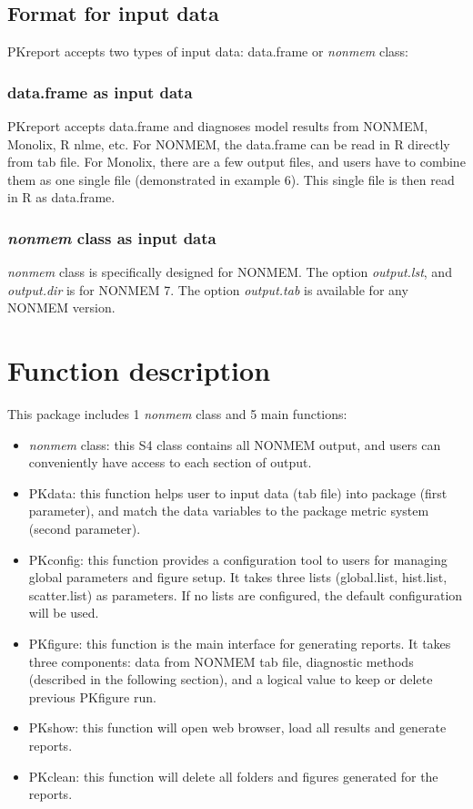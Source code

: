 \documentclass[a4paper]{article}
\begin{document}
\subsection{Format for input data}

PKreport accepts two types of input data: data.frame or \textit{nonmem} class:

\subsubsection{data.frame as input data}

PKreport accepts data.frame and diagnoses model results from NONMEM, Monolix, R nlme, etc. For NONMEM, the data.frame can be read in R directly from tab file. For Monolix, there are a few output files, and users have to combine them as one single file (demonstrated in example 6). This single file is then read in R as data.frame.

\subsubsection{\textit{nonmem} class as input data}

\textit{nonmem} class is specifically designed for NONMEM. The option \textit{output.lst}, and \textit{ output.dir} is for NONMEM 7. The option \textit{ output.tab} is available for any NONMEM version.

\section{Function description}
This package includes 1 \textit{nonmem} class and 5 main functions:
\begin{itemize}
	\item  \textit{nonmem} class: this S4 class contains all NONMEM output, and users can conveniently have access to each section of output.
	\item PKdata: this function helps user to input data (tab file) into package (first parameter), and match the data variables to the package metric system (second parameter).
	\item PKconfig: this function provides a configuration tool to users for managing global parameters and figure setup. It takes three lists (global.list, hist.list, scatter.list) as parameters.  If no lists are configured, the default configuration will be used.
	\item PKfigure: this function is the main interface for generating reports.
  It takes three components: data from NONMEM tab file, diagnostic methods (described in the following
  section), and a logical value to keep or delete previous PKfigure run.
	\item PKshow: this function will open web browser, load all results and generate reports.
	\item PKclean: this function will delete all folders and figures generated for the reports.
\end{itemize}
\end{document}

